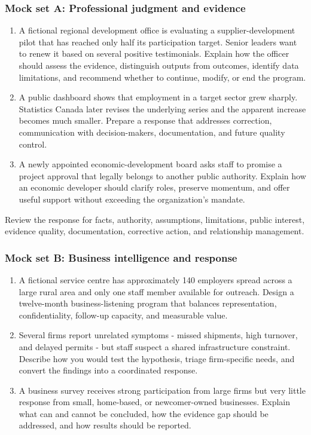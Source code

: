 \documentclass[11pt,letterpaper,oneside,openany]{book}
\begin{document}
\subsubsection[Mock set A: Professional judgment and evidence]{Mock set A: Professional judgment and evidence}
\begin{enumerate}
\item A fictional regional development office is evaluating a supplier-development pilot that has reached only half its participation target. Senior leaders want to renew it based on several positive testimonials. Explain how the officer should assess the evidence, distinguish outputs from outcomes, identify data limitations, and recommend whether to continue, modify, or end the program.
\item A public dashboard shows that employment in a target sector grew sharply. Statistics Canada later revises the underlying series and the apparent increase becomes much smaller. Prepare a response that addresses correction, communication with decision-makers, documentation, and future quality control.
\item A newly appointed economic-development board asks staff to promise a project approval that legally belongs to another public authority. Explain how an economic developer should clarify roles, preserve momentum, and offer useful support without exceeding the organization's mandate.
\end{enumerate}


Review the response for facts, authority, assumptions, limitations, public interest, evidence quality, documentation, corrective action, and relationship management.


\subsubsection[Mock set B: Business intelligence and response]{Mock set B: Business intelligence and response}
\begin{enumerate}
\item A fictional service centre has approximately 140 employers spread across a large rural area and only one staff member available for outreach. Design a twelve-month business-listening program that balances representation, confidentiality, follow-up capacity, and measurable value.
\item Several firms report unrelated symptoms - missed shipments, high turnover, and delayed permits - but staff suspect a shared infrastructure constraint. Describe how you would test the hypothesis, triage firm-specific needs, and convert the findings into a coordinated response.
\item A business survey receives strong participation from large firms but very little response from small, home-based, or newcomer-owned businesses. Explain what can and cannot be concluded, how the evidence gap should be addressed, and how results should be reported.
\end{enumerate}
\end{document}

